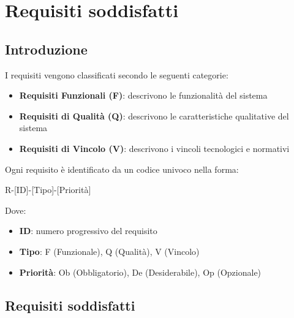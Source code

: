 \section{Requisiti soddisfatti}

\subsection{Introduzione}
I requisiti vengono classificati secondo le seguenti categorie:
\begin{itemize}
    \item \textbf{Requisiti Funzionali (F)}: descrivono le funzionalità del sistema
    \item \textbf{Requisiti di Qualità (Q)}: descrivono le caratteristiche qualitative del sistema
    \item \textbf{Requisiti di Vincolo (V)}: descrivono i vincoli tecnologici e normativi
\end{itemize}

Ogni requisito è identificato da un codice univoco nella forma:
\begin{center}
R-[ID]-[Tipo]-[Priorità]
\end{center}

Dove:
\begin{itemize}
    \item \textbf{ID}: numero progressivo del requisito
    \item \textbf{Tipo}: F (Funzionale), Q (Qualità), V (Vincolo)
    \item \textbf{Priorità}: Ob (Obbligatorio), De (Desiderabile), Op (Opzionale)
\end{itemize}

\newpage

\subsection{Requisiti soddisfatti}

\setlength{\LTleft}{0cm}
\renewcommand{\arraystretch}{1.3}

